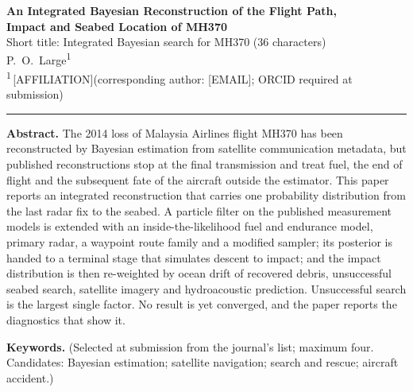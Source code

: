 \documentclass[12pt,a4paper]{article}
\begin{document}
\begin{center}
{\large\bfseries An Integrated Bayesian Reconstruction of the Flight Path,\\
Impact and Seabed Location of MH370}\\[4pt]
{\small Short title: Integrated Bayesian search for MH370 \quad(36 characters)}\\[10pt]
{P.\ O.\ Large\textsuperscript{1}}\\[4pt]
{\small\textsuperscript{1}\,[AFFILIATION]\quad(corresponding author: [EMAIL]; ORCID required at submission)}
\end{center}

\vspace{6pt}
\hrule
\vspace{6pt}

\noindent\textbf{Abstract.}
The 2014 loss of Malaysia Airlines flight MH370 has been reconstructed by Bayesian
estimation from satellite communication metadata, but published reconstructions stop at the
final transmission and treat fuel, the end of flight and the subsequent fate of the aircraft
outside the estimator. This paper reports an integrated reconstruction that carries one
probability distribution from the last radar fix to the seabed. A particle filter on the
published measurement models is extended with an inside-the-likelihood fuel and endurance
model, primary radar, a waypoint route family and a modified sampler; its posterior is handed
to a terminal stage that simulates descent to impact; and the impact distribution is then
re-weighted by ocean drift of recovered debris, unsuccessful seabed search, satellite imagery
and hydroacoustic prediction. Unsuccessful search is the largest single factor. No result is
yet converged, and the paper reports the diagnostics that show it.

\vspace{4pt}
\noindent\textbf{Keywords.} (Selected at submission from the journal's list; maximum four.
Candidates: Bayesian estimation; satellite navigation; search and rescue; aircraft accident.)

\end{document}
